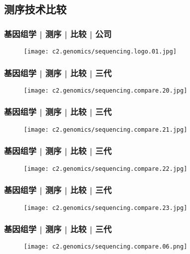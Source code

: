 \subsection{测序技术比较}
\begin{frame}
  \frametitle{基因组学 | 测序 | 比较 | 公司}
  \begin{figure}
    \centering
    \texttt{[image: c2.genomics/sequencing.logo.01.jpg]}
  \end{figure}
\end{frame}

\begin{frame}
  \frametitle{基因组学 | 测序 | 比较 | 三代}
  \begin{figure}
    \centering
    \texttt{[image: c2.genomics/sequencing.compare.20.jpg]}
  \end{figure}
\end{frame}

\begin{frame}
  \frametitle{基因组学 | 测序 | 比较 | 三代}
  \begin{figure}
    \centering
    \texttt{[image: c2.genomics/sequencing.compare.21.jpg]}
  \end{figure}
\end{frame}

\begin{frame}
  \frametitle{基因组学 | 测序 | 比较 | 三代}
  \begin{figure}
    \centering
    \texttt{[image: c2.genomics/sequencing.compare.22.jpg]}
  \end{figure}
\end{frame}

\begin{frame}
  \frametitle{基因组学 | 测序 | 比较 | 三代}
  \begin{figure}
    \centering
    \texttt{[image: c2.genomics/sequencing.compare.23.jpg]}
  \end{figure}
\end{frame}

\begin{frame}
  \frametitle{基因组学 | 测序 | 比较 | 三代}
  \begin{figure}
    \centering
    \texttt{[image: c2.genomics/sequencing.compare.06.png]}
  \end{figure}
\end{frame}


